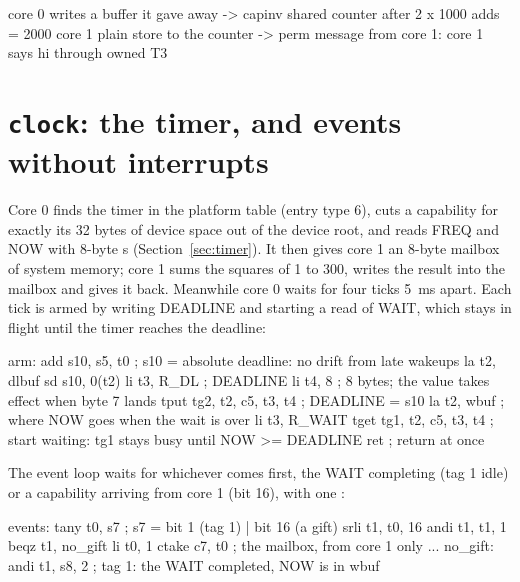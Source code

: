 \begin{shell}
core 0 writes a buffer it gave away   -> capinv
shared counter after 2 x 1000 adds    = 2000
core 1 plain store to the counter     -> perm
message from core 1: core 1 says hi through owned T3
\end{shell}

\section{\texttt{clock}: the timer, and events without interrupts}\label{sec:ex-clock}
Core 0 finds the timer in the platform table (entry type 6), cuts a capability for exactly its 32
bytes of device space out of the device root, and reads FREQ and NOW with 8-byte s
(Section~\ref{sec:timer}). It then gives core 1 an 8-byte mailbox of system memory; core 1 sums the
squares of 1 to 300, writes the result into the mailbox and gives it back. Meanwhile core 0 waits for
four ticks 5~ms apart. Each tick is armed by writing DEADLINE and starting a read of WAIT, which stays
in flight until the timer reaches the deadline:

\begin{asm}
arm:
        add   s10, s5, t0               ; s10 = absolute deadline: no drift from late wakeups
        la    t2, dlbuf
        sd    s10, 0(t2)
        li    t3, R_DL                  ; DEADLINE
        li    t4, 8                     ; 8 bytes; the value takes effect when byte 7 lands
        tput  tg2, t2, c5, t3, t4       ; DEADLINE = s10
        la    t2, wbuf                  ; where NOW goes when the wait is over
        li    t3, R_WAIT
        tget  tg1, t2, c5, t3, t4       ; start waiting: tg1 stays busy until NOW >= DEADLINE
        ret                             ; return at once
\end{asm}

The event loop waits for whichever comes first, the WAIT completing (tag 1 idle) or a capability
arriving from core 1 (bit 16), with one :

\begin{asm}
events:
        tany  t0, s7                    ; s7 = bit 1 (tag 1) | bit 16 (a gift)
        srli  t1, t0, 16
        andi  t1, t1, 1
        beqz  t1, no_gift
        li    t0, 1
        ctake c7, t0                    ; the mailbox, from core 1 only
        ...
no_gift:
        andi  t1, s8, 2                 ; tag 1: the WAIT completed, NOW is in wbuf
\end{asm}

